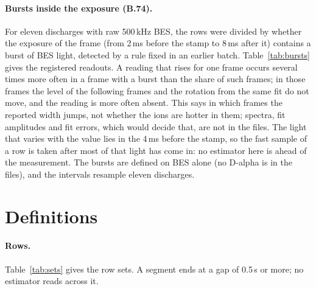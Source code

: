 \documentclass[11pt,a4paper]{article}
\begin{document}
\begin{table}[tbp]
  \centering
  \caption{\CapStuckEcei}
  \label{tab:stuck}
  \TabStuckEcei
\end{table}

\paragraph{Bursts inside the exposure (B.74).} For eleven discharges with raw 500\,kHz
BES, the rows were divided by whether the exposure of the frame (from 2\,ms before the
stamp to 8\,ms after it) contains a burst of BES light, detected by a rule fixed in an
earlier batch. Table~\ref{tab:bursts} gives the registered readouts. A reading that rises
for one frame occurs several times more often in a frame with a burst than the share of
such frames; in those frames the level of the following frames and the rotation from the
same fit do not move, and the reading is more often absent. This says in which frames the
reported width jumps, not whether the ions are hotter in them; spectra, fit amplitudes and
fit errors, which would decide that, are not in the files. The light that varies with the
value lies in the 4\,ms before the stamp, so the fast sample of a row is taken after most
of that light has come in: no estimator here is ahead of the measurement. The bursts are
defined on BES alone (no D-alpha is in the files), and the intervals resample eleven
discharges.

\begin{table}[tbp]
  \centering
  \caption{\CapBursts}
  \label{tab:bursts}
  \TabBursts
\end{table}

\section{Definitions}
\label{sec:sdefs}

\paragraph{Rows.} Table~\ref{tab:sets} gives the row sets. A segment ends at a gap of 0.5\,s or more; no estimator
reads across it.

\begin{table}[tbp]
  \centering
  \caption{\CapSets}
  \label{tab:sets}
  \TabSets
\end{table}
\end{document}
